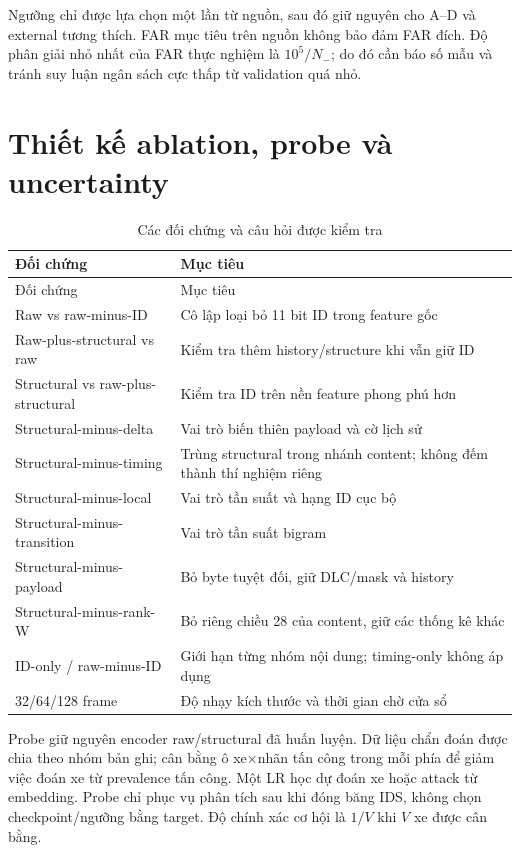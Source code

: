\documentclass[12pt,a4paper,oneside,openany]{extbook}
\begin{document}
Ngưỡng chỉ được lựa chọn một lần từ nguồn, sau đó giữ nguyên cho A--D và external tương thích. FAR mục tiêu trên nguồn không bảo đảm FAR đích. Độ phân giải nhỏ nhất của FAR thực nghiệm là $10^5/N_-$; do đó cần báo số mẫu và tránh suy luận ngân sách cực thấp từ validation quá nhỏ.

\section{Thiết kế ablation, probe và uncertainty}
\begin{longtable}{P{4cm}P{8.9cm}}
\caption{Các đối chứng và câu hỏi được kiểm tra}\label{tab:ablations}\\\toprule
Đối chứng & Mục tiêu\\\midrule\endfirsthead\toprule Đối chứng & Mục tiêu\\\midrule\endhead
Raw vs raw-minus-ID & Cô lập loại bỏ 11 bit ID trong feature gốc\\
Raw-plus-structural vs raw & Kiểm tra thêm history/structure khi vẫn giữ ID\\
Structural vs raw-plus-structural & Kiểm tra ID trên nền feature phong phú hơn\\
Structural-minus-delta & Vai trò biến thiên payload và cờ lịch sử\\
Structural-minus-timing & Trùng structural trong nhánh content; không đếm thành thí nghiệm riêng\\
Structural-minus-local & Vai trò tần suất và hạng ID cục bộ\\
Structural-minus-transition & Vai trò tần suất bigram\\
Structural-minus-payload & Bỏ byte tuyệt đối, giữ DLC/mask và history\\
Structural-minus-rank-W & Bỏ riêng chiều 28 của content, giữ các thống kê khác\\
ID-only / raw-minus-ID & Giới hạn từng nhóm nội dung; timing-only không áp dụng\\
32/64/128 frame & Độ nhạy kích thước và thời gian chờ cửa sổ\\\bottomrule
\end{longtable}
Probe giữ nguyên encoder raw/structural đã huấn luyện. Dữ liệu chẩn đoán được chia theo nhóm bản ghi; cân bằng ô xe×nhãn tấn công trong mỗi phía để giảm việc đoán xe từ prevalence tấn công. Một LR học dự đoán xe hoặc attack từ embedding. Probe chỉ phục vụ phân tích sau khi đóng băng IDS, không chọn checkpoint/ngưỡng bằng target. Độ chính xác cơ hội là $1/V$ khi $V$ xe được cân bằng.
\end{document}

